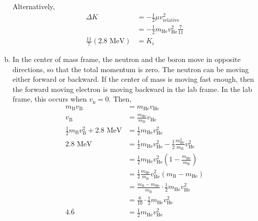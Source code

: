 \documentclass[solutions]{esg8012pset}
\begin{document}
\begin{enumerate}[a)]
  Alternatively, \begin{align*} \Delta K & = -\frac{1}{2}\mu v_{\text{relative}}^2 \\
    & = -\frac{1}{2} m_{\text{He}} v_{\text{He}}^2 \frac{7}{11} \\
    \frac{11}{7}(2.8\text{ MeV}) & = K_i
    \end{align*}
    \item In the center of mass frame, the neutron and the boron move in opposite directions, so that the total momentum is zero.  The neutron can be moving either forward or backward.  If the center of mass is moving fast enough, then the forward moving electron is moving backward in the lab frame.  In the lab frame, this occurs when $v_{\text{n}} = 0$.  Then, \begin{align*}
      m_{\text{B}}v_{\text{B}} & = m_{\text{He}}v_{\text{He}} \\
      v_{\text{B}} & = \frac{m_{\text{He}}}{m_{\text{B}}}v_{\text{He}} \\
      \frac{1}{2}m_{\text{B}}v_{\text{B}}^2 + 2.8\text{ MeV} & = \frac{1}{2}m_{\text{He}}v_{\text{He}}^2 \\
      2.8\text{ MeV} & = \frac{1}{2}m_{\text{He}}v_{\text{He}}^2 - \frac{1}{2}\frac{m_{\text{He}}^2}{m_{\text{B}}}v_{\text{He}}^2 \\
      & = \frac{1}{2}m_{\text{He}}v_{\text{He}}^2\left(1 - \frac{m_{\text{He}}}{m_{\text{B}}}\right) \\
      & = \frac{1}{2}\frac{m_{\text{He}}}{m_{\text{B}}}v_{\text{He}}^2(m_{\text{B}} - m_{\text{He}}) \\
      & = \frac{m_{\text{B}} - m_{\text{He}}}{m_{\text{B}}} \cdot \frac{1}{2}m_{\text{He}}v_{\text{He}}^2 \\
      & = \frac{6}{10} \cdot \frac{1}{2}m_{\text{He}}v_{\text{He}}^2 \\
    4.\overline{6} & = \frac{1}{2}m_{\text{He}}v_{\text{He}}^2
    \end{align*}

\end{enumerate}
\end{document}
